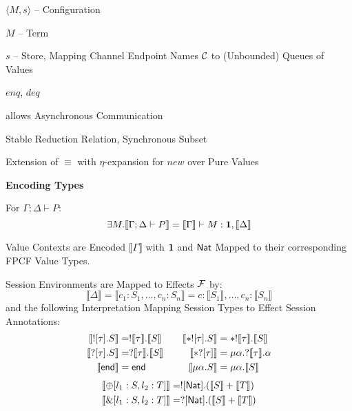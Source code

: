 $\langle M,s \rangle$ -- Configuration

$M$ -- Term

$s$ -- Store, Mapping Channel Endpoint Names $\mathcal{C}$ to
(Unbounded) Queues of Values

$enq$, $deq$ %


allows Asynchronous Communication

Stable Reduction Relation, Synchronous Subset

Extension of $\equiv$ with $\eta$-expansion for $new$ over Pure Values


\textbf{Encoding Types}

For $\Gamma;\Delta \vdash P$:
\[
  \exists M.\llbracket \Gamma;\Delta \vdash P \rrbracket
    = \llbracket \Gamma \rrbracket \vdash M:\mathbf{1},
      \llbracket \Delta \rrbracket
\]

Value Contexts are Encoded $\llbracket\Gamma\rrbracket$ with $\mathbf{1}$
and $\mathsf{Nat}$ Mapped to their corresponding FPCF Value Types.

Session Environments are Mapped to Effects $\mathcal{F}$ by:
\[
  \llbracket\Delta\rrbracket
    = \llbracket c_1:S_1, \ldots, c_n:S_n \rrbracket
    = c:\llbracket S_1 \rrbracket, \ldots, c_n:\llbracket S_n \rrbracket
\]
and the following Interpretation Mapping Session Types to Effect
Session Annotations:
\[
  \begin{aligned}
    \llbracket ![\tau].S \rrbracket
      &= !\llbracket\tau\rrbracket.\llbracket S \rrbracket \\
    \llbracket ?[\tau].S \rrbracket
      &= ?\llbracket\tau\rrbracket.\llbracket S \rrbracket \\
    \llbracket\mathsf{end}\rrbracket &= \mathsf{end}
  \end{aligned}
  \quad\quad
  \begin{aligned}
    \llbracket *![\tau].S \rrbracket
      &= *!\llbracket\tau\rrbracket.\llbracket S \rrbracket \\
    \llbracket *?[\tau] \rrbracket
      &= \mu\alpha.?\llbracket\tau\rrbracket.\alpha \\
    \llbracket \mu\alpha.S \rrbracket
      &= \mu\alpha.\llbracket S \rrbracket
  \end{aligned}
\]
\begin{align*}
  \llbracket \oplus[l_1:S,l_2:T] \rrbracket
    &= ![\mathsf{Nat}].(\llbracket S \rrbracket + \llbracket T \rrbracket) \\
  \llbracket \&[l_1:S,l_2:T] \rrbracket
    &= ?[\mathsf{Nat}].(\llbracket S \rrbracket + \llbracket T \rrbracket)
\end{align*}

